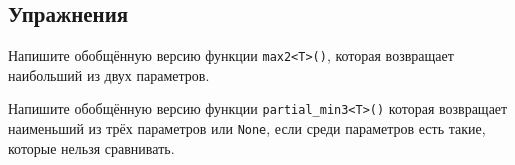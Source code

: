 \subsection {Упражнения}

\begin{Exercise}
    \Question
    Напишите обобщённую версию функции \texttt{max2<T>()}, которая возвращает наибольший из двух параметров.
\end{Exercise}
    
\begin{Exercise}
    \Question
    Напишите обобщённую версию функции \texttt{partial\_min3<T>()} которая возвращает наименьший из трёх параметров или \texttt{None}, если среди параметров есть такие, которые нельзя сравнивать.
\end{Exercise}
